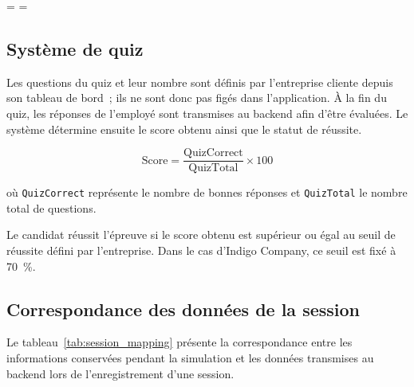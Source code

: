\vspace{6pt}

\label{fig:activite_simulation}



\clearpage
\endgroup


\setlength{\paperwidth}{210mm}
\setlength{\paperheight}{297mm}
\pdfpagewidth=\paperwidth
\pdfpageheight=\paperheight

\subsection{Système de quiz}

Les questions du quiz et leur nombre sont définis par l'entreprise cliente depuis
son tableau de bord~; ils ne sont donc pas figés dans l'application.
À la fin du quiz, les réponses de l'employé sont transmises au backend afin
d'être évaluées. Le système détermine ensuite le score obtenu ainsi que le
statut de réussite.

\[
  \text{Score} = \frac{\text{QuizCorrect}}{\text{QuizTotal}} \times 100
\]

où \texttt{QuizCorrect} représente le nombre de bonnes réponses et
\texttt{QuizTotal} le nombre total de questions.

Le candidat réussit l'épreuve si le score obtenu est supérieur ou égal au
seuil de réussite défini par l'entreprise. Dans le cas d'Indigo Company,
ce seuil est fixé à 70~\%.

\subsection{Correspondance des données de la session}

Le tableau~\ref{tab:session_mapping} présente la correspondance entre les
informations conservées pendant la simulation et les données transmises
au backend lors de l'enregistrement d'une session.

